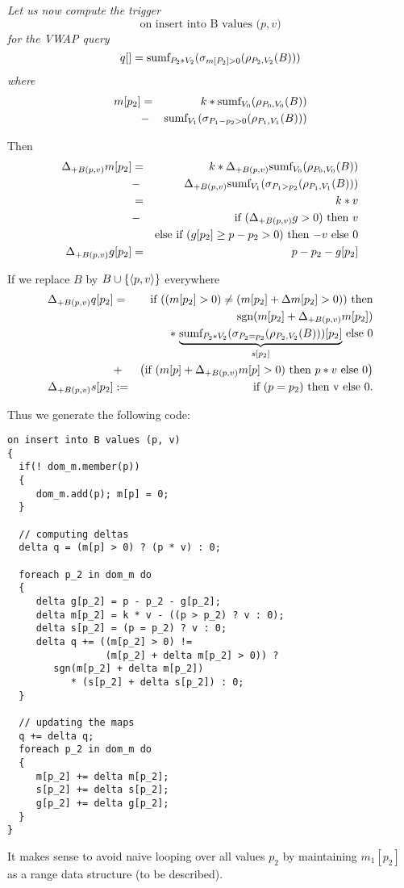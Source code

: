 \begin{example}\em
Let us now compute the trigger
\[
\mbox{on insert into B values ($p, v$)}
\]
for the VWAP query
\[
q[] = \mbox{sumf}_{P_2 * V_2}(\sigma_{m[P_2] > 0}(\rho_{P_2, V_2}(B)))
\]
where
\begin{eqnarray*}
m[p_2] &=&  k * \mbox{sumf}_{V_0}(\rho_{P_0, V_0}(B))   \\
       &-&  \mbox{sumf}_{V_1}(\sigma_{P_1 - p_2 > 0}(\rho_{P_1, V_1}(B)))
\end{eqnarray*}

Then
\begin{eqnarray*}
\Delta_{+B(p,v)} m[p_2] &=&
            k * \Delta_{+B(p,v)} \mbox{sumf}_{V_0}(\rho_{P_0, V_0}(B))   \\
       &-&  \Delta_{+B(p,v)} \mbox{sumf}_{V_1}(\sigma_{P_1 > p_2}(\rho_{P_1, V_1}(B)))
\\
&=& k * v \\
&-& \mbox{if $(\Delta_{+B(p,v)} g > 0)$ then $v$} \\
& & \mbox{else if $(g[p_2] \ge p-p_2 > 0)$ then $-v$ else 0}
\\
\Delta_{+B(p,v)} g[p_2] &=& p - p_2 - g[p_2]
\end{eqnarray*}



If we replace $B$ by $B \cup \{{\langle p, v\rangle}\}$ everywhere
\begin{eqnarray*}
\Delta_{+B(p,v)} q[p_2] &=&
\mbox{if ($(m[p_2] > 0) \neq (m[p_2] + \Delta m[p_2] > 0))$ then}
\\
&& ~~~
      \mbox{sgn}(m[p_2] + \Delta_{+B(p,v)} m[p_2]) \\
&& ~~~~~~ * \;  \mbox{$\underbrace{\mbox{sumf}_{P_2 * V_2}(\sigma_{P_2=p_2}(\rho_{P_2,V_2}(B)))[p_2]}_{s[p_2]}$ else 0}
\\
&+&
\big( \mbox{if $(m[p] + \Delta_{+B(p,v)} m[p] > 0)$ then $p * v$ else $0$} \big)
\\
\Delta_{+B(p,v)} s[p_2] &:=& \mbox{if $(p = p_2)$ then v else 0}.
\end{eqnarray*}

Thus we generate the following code:
\begin{verbatim}
on insert into B values (p, v)
{
  if(! dom_m.member(p))
  {
     dom_m.add(p); m[p] = 0;
  }

  // computing deltas
  delta q = (m[p] > 0) ? (p * v) : 0;

  foreach p_2 in dom_m do
  {
     delta g[p_2] = p - p_2 - g[p_2];
     delta m[p_2] = k * v - ((p > p_2) ? v : 0);
     delta s[p_2] = (p = p_2) ? v : 0;
     delta q += ((m[p_2] > 0) !=
                 (m[p_2] + delta m[p_2] > 0)) ?
        sgn(m[p_2] + delta m[p_2])
           * (s[p_2] + delta s[p_2]) : 0;
  }

  // updating the maps
  q += delta q;
  foreach p_2 in dom_m do
  {
     m[p_2] += delta m[p_2];
     s[p_2] += delta s[p_2];
     g[p_2] += delta g[p_2];
  }
}
\end{verbatim}


It makes sense to avoid naive looping over all values $p_2$ by maintaining
$m_1[p_2]$ as a range data structure (to be described).
\punto
\end{example}

